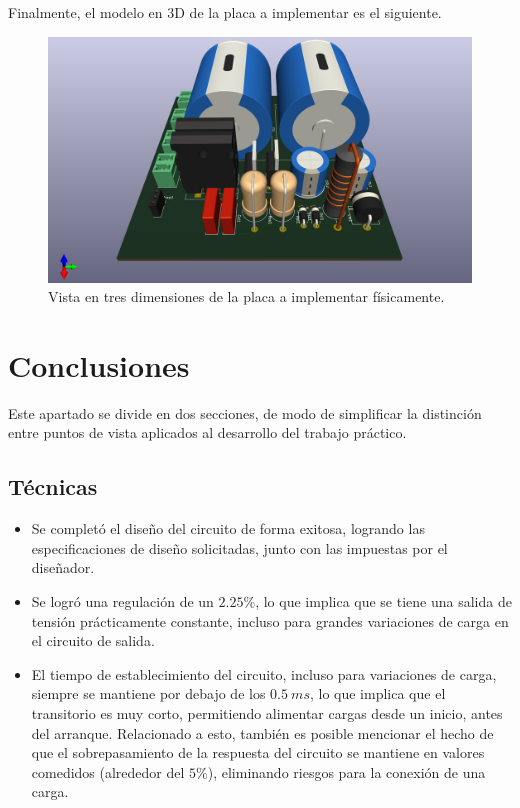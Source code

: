 Finalmente, el modelo en 3D de la placa a implementar es el siguiente.

\begin{figure}
	\centering
	\includegraphics[width=0.8\linewidth]{img/pcb3D}
	\caption{Vista en tres dimensiones de la placa a implementar físicamente.}
	\label{fig:pcb3d}
\end{figure}

\clearpage

\section{Conclusiones}

Este apartado se divide en dos secciones, de modo de simplificar la distinción entre puntos de vista aplicados al desarrollo del trabajo práctico.

\subsection{Técnicas}

\begin{itemize}
	\item Se completó el diseño del circuito de forma exitosa, logrando las especificaciones de diseño solicitadas, junto con las impuestas por el diseñador.
	\item Se logró una regulación de un $2.25\%$, lo que implica que se tiene una salida de tensión prácticamente constante, incluso para grandes variaciones de carga en el circuito de salida. 
	\item El tiempo de establecimiento del circuito, incluso para variaciones de carga, siempre se mantiene por debajo de los $0.5 \ ms$, lo que implica que el transitorio es muy corto, permitiendo alimentar cargas desde un inicio, antes del arranque. Relacionado a esto, también es posible mencionar el hecho de que el sobrepasamiento de la respuesta del circuito se mantiene en valores comedidos (alrededor del $5\%$), eliminando riesgos para la conexión de una carga.
\end{itemize}

